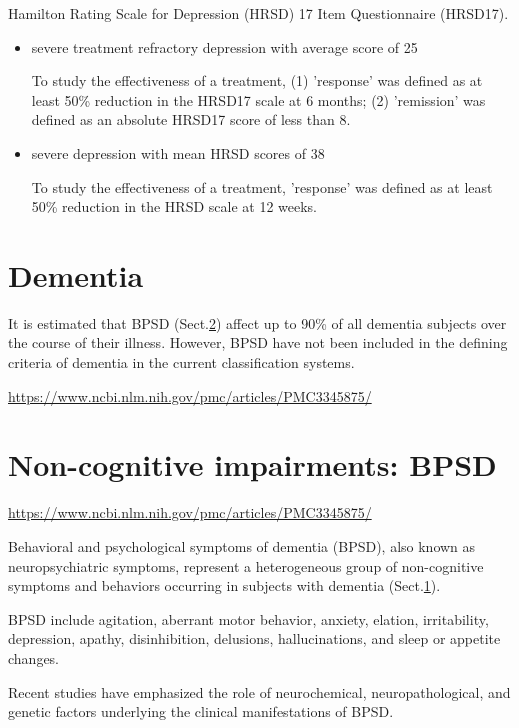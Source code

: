 Hamilton Rating Scale for Depression (HRSD) 17 Item Questionnaire (HRSD17).
\begin{itemize}
  
  \item severe treatment refractory depression with average score of 25
  
To study the effectiveness of a treatment, (1) 'response' was defined as at
least 50\% reduction in the HRSD17 scale at 6 months; (2) 'remission' was
defined as an absolute HRSD17 score of less than 8.

  \item  severe depression with mean HRSD scores of 38

To study the effectiveness of a treatment, 'response' was defined as at least
50\% reduction in the HRSD scale at 12 weeks. 

\end{itemize}





\section{Dementia}
\label{sec:dementia}

It is estimated that BPSD (Sect.\ref{sec:BPSD}) affect up to 90\% of all
dementia subjects over the course of their illness. However,  BPSD have not been
included in the defining criteria of dementia in the current classification
systems.

\url{https://www.ncbi.nlm.nih.gov/pmc/articles/PMC3345875/}

\section{Non-cognitive impairments: BPSD}
\label{sec:BPSD}
\label{sec:non-cognitive-impairment}

\url{https://www.ncbi.nlm.nih.gov/pmc/articles/PMC3345875/}

Behavioral and psychological symptoms of dementia (BPSD), also known as
neuropsychiatric symptoms, represent a heterogeneous group of non-cognitive
symptoms and behaviors occurring in subjects with dementia
(Sect.\ref{sec:dementia}).

BPSD include agitation, aberrant motor behavior, anxiety, elation, irritability,
depression, apathy, disinhibition, delusions, hallucinations, and sleep or
appetite changes.

 Recent studies have emphasized the role of neurochemical, neuropathological,
and genetic factors underlying the clinical manifestations of BPSD.



